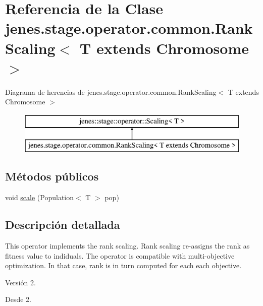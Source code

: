 \hypertarget{classjenes_1_1stage_1_1operator_1_1common_1_1_rank_scaling_3_01_t_01extends_01_chromosome_01_4}{\section{Referencia de la Clase jenes.\-stage.\-operator.\-common.\-Rank\-Scaling$<$ T extends Chromosome $>$}
\label{classjenes_1_1stage_1_1operator_1_1common_1_1_rank_scaling_3_01_t_01extends_01_chromosome_01_4}
}
Diagrama de herencias de jenes.\-stage.\-operator.\-common.\-Rank\-Scaling$<$ T extends Chromosome $>$\begin{figure}[H]
\begin{center}
\leavevmode
\includegraphics[height=2.000000cm]{classjenes_1_1stage_1_1operator_1_1common_1_1_rank_scaling_3_01_t_01extends_01_chromosome_01_4}
\end{center}
\end{figure}
\subsection*{Métodos públicos}
\begin{DoxyCompactItemize}
\item 
void \hyperlink{classjenes_1_1stage_1_1operator_1_1common_1_1_rank_scaling_3_01_t_01extends_01_chromosome_01_4_a8158f18c672b8764a11ba70a52514132}{scale} (Population$<$ T $>$ pop)
\end{DoxyCompactItemize}


\subsection{Descripción detallada}
This operator implements the rank scaling. Rank scaling re-\/assigns the rank as fitness value to indiduals. The operator is compatible with multi-\/objective optimization. In that case, rank is in turn computed for each each objective.

\begin{DoxyVersion}{Versión}
2. 
\end{DoxyVersion}
\begin{DoxySince}{Desde}
2. 
\end{DoxySince}


